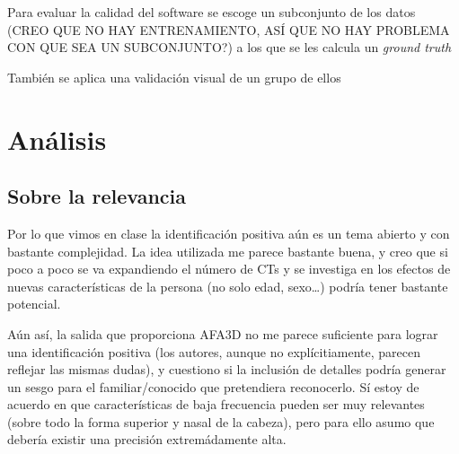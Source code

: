 \documentclass[13pt,a4paper]{article}
\begin{document}
Para evaluar la calidad del software se escoge un subconjunto de los datos (CREO QUE NO HAY ENTRENAMIENTO, ASÍ QUE NO HAY PROBLEMA CON QUE SEA UN SUBCONJUNTO?) a los que se les calcula un \textit{ground truth}

También se aplica una validación visual de un grupo de ellos


\section{Análisis}

\subsection{Sobre la relevancia}

Por lo que vimos en clase la identificación positiva aún es un tema abierto y con bastante complejidad.
La idea utilizada me parece bastante buena, y creo que si poco a poco se va expandiendo el número de CTs y se investiga en los efectos de nuevas características de la persona (no solo edad, sexo\dots) podría tener bastante potencial.

Aún así, la salida que proporciona AFA3D no me parece suficiente para lograr una identificación positiva (los autores, aunque no explícitiamente, parecen reflejar las mismas dudas), y cuestiono si la inclusión de detalles podría generar un sesgo para el familiar/conocido que pretendiera reconocerlo. Sí estoy de acuerdo en que características de baja frecuencia pueden ser muy relevantes (sobre todo la forma superior y nasal de la cabeza), pero para ello asumo que debería existir una precisión extremádamente alta.



\end{document}
